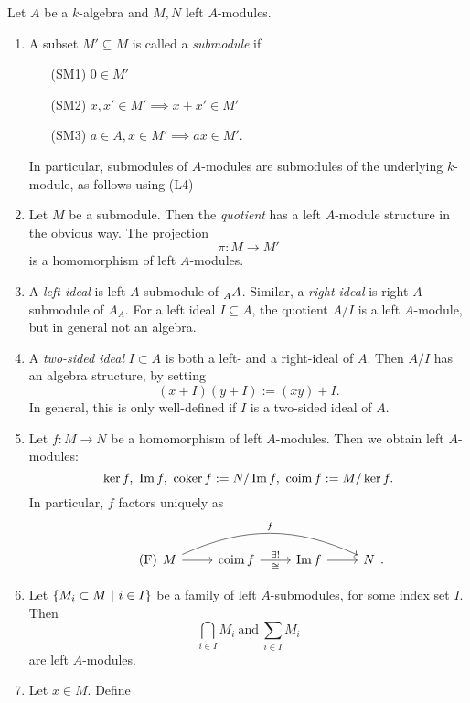 \begin{rem}
  Let $A$ be a $k$-algebra and $M,N$ left $A$-modules.
  \begin{enumerate}
    \item A subset $M'\subseteq M$ is called a \emph{submodule}  if
      \begin{itemize}
        \item[(SM1)] $0\in M'$
        \item[(SM2)] $x,x'\in M'\implies x+x'\in M'$
        \item[(SM3)] $a\in A,x\in M'\implies ax\in M'.$
      \end{itemize}
      \color{purple} In particular, submodules of $A$-modules are submodules of the underlying $k$-module, as follows using (L4)\color{black}
    \item Let $M$ be a submodule. Then the \emph{quotient}  has a left $A$-module structure in the obvious way. The projection
    \[
    \pi: M\to M'
    \]
    is a homomorphism of left $A$-modules.
    \item A \emph{left ideal}  is left $A$-submodule of $\prescript{}{A}{A}$. Similar, a \emph{right ideal} is right $A$-submodule of $A_A$. For a left ideal $I\subseteq A$, the quotient $A/I$ is a left $A$-module, but in general not an algebra.
    \item A \emph{two-sided ideal} $I\subset A$ is both a left- and a right-ideal of $A$. Then $A/I$ has an algebra structure, by setting
    \[
    (x+I)(y+I):=(xy)+I.
    \]
    \color{purple} In general, this is only well-defined if $I$ is a two-sided ideal of $A$.\color{black}
    \item Let $f:M\to N$ be a homomorphism of left $A$-modules. Then we obtain left $A$-modules:
    \[
    \ker f,~\operatorname{Im} f,~\operatorname{coker} f:= N/\operatorname{Im} f,~\operatorname{coim} f:= M/\ker f.
    \]
    In particular, $f$ factors uniquely as
    \begin{equation}\label{2:fact}\tag{F}
    \begin{tikzcd}
      M \ar{r}{}  \ar[bend left = 25]{rrr}{f}& \coim f \ar{r}{\exists !}[swap]{\cong} & \im f \ar{r}{} & N
    \end{tikzcd}.
  \end{equation}
    \item Let $\{M_i\subset M~|~ i\in I\}$ be a family of left $A$-submodules, for some index set $I$. Then
    \[\bigcap_{i\in I}M_i~\text{and}~\sum_{i\in I}M_i\]
    are left $A$-modules.
    \item Let $x\in M$. Define

\end{enumerate}
\end{rem}
